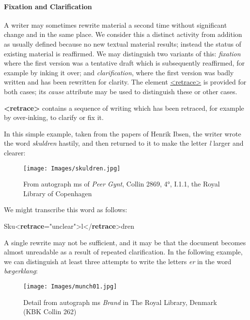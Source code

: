 \paragraph[{Fixation and Clarification}]{Fixation and Clarification}\label{PH-fix}\par
A writer may sometimes rewrite material a second time without significant change and in the same place. We consider this a distinct activity from addition as usually defined because no new textual material results; instead the status of existing material is reaffirmed. We may distinguish two variants of this: \textit{fixation} where the first version was a tentative draft which is subsequently reaffirmed, for example by inking it over; and \textit{clarification}, where the first version was badly written and has been rewritten for clarity. The element \hyperref[TEI.retrace]{<retrace>} is provided for both cases; its {\itshape cause} attribute may be used to distinguish these or other cases. 
\begin{sansreflist}
  
\item [\textbf{<retrace>}] contains a sequence of writing which has been retraced, for example by over-inking, to clarify or fix it.
\end{sansreflist}
\par
In this simple example, taken from the papers of Henrik Ibsen, the writer wrote the word \textit{skuldren} hastily, and then returned to it to make the letter \textit{l} larger and clearer: \begin{figure}[htbp]
\noindent\noindent\texttt{[image: Images/skuldren.jpg]}
\caption{From autograph ms of \textit{Peer Gynt}, Collin 2869, 4°, I.1.1, the Royal Library of Copenhagen}\end{figure}
 We might transcribe this word as follows: \par\bgroup{}\exampleFont \begin{shaded}\noindent\mbox{} Sku{<\textbf{retrace}\hspace*{1em}{cause}="{unclear}">}l{</\textbf{retrace}>}dren\mbox{}\newline 
\end{shaded}\egroup\par \par
A single rewrite may not be sufficient, and it may be that the document becomes almost unreadable as a result of repeated clarification. In the following example, we can distinguish at least three attempts to write the letters \textit{er} in the word \textit{bægerklang}: \begin{figure}[htbp]
\noindent\noindent\texttt{[image: Images/munch01.jpg]}
\caption{Detail from autograph ms \textit{Brand} in The Royal Library, Denmark (KBK Collin 262)}\end{figure}

